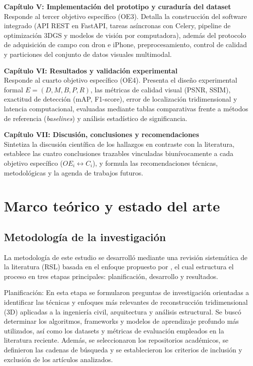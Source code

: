 \documentclass[12pt,oneside]{report}
\begin{document}
\textbf{Capítulo V: Implementación del prototipo y curaduría del dataset} \\
Responde al tercer objetivo específico (OE3). Detalla la construcción del software integrado (API REST en FastAPI, tareas asíncronas con Celery, pipeline de optimización 3DGS y modelos de visión por computadora), además del protocolo de adquisición de campo con dron e iPhone, preprocesamiento, control de calidad y particiones del conjunto de datos visuales multimodal.

\textbf{Capítulo VI: Resultados y validación experimental} \\
Responde al cuarto objetivo específico (OE4). Presenta el diseño experimental formal $E = (D, M, B, P, R)$, las métricas de calidad visual (PSNR, SSIM), exactitud de detección (mAP, F1-score), error de localización tridimensional y latencia computacional, evaluadas mediante tablas comparativas frente a métodos de referencia (\textit{baselines}) y análisis estadístico de significancia.

\textbf{Capítulo VII: Discusión, conclusiones y recomendaciones} \\
Sintetiza la discusión científica de los hallazgos en contraste con la literatura, establece las cuatro conclusiones trazables vinculadas biunívocamente a cada objetivo específico ($OE_i \leftrightarrow C_i$), y formula las recomendaciones técnicas, metodológicas y la agenda de trabajos futuros.

\chapter{Marco teórico y estado del arte}

\section{Metodología de la investigación}
La metodología de este estudio se desarrolló mediante una revisión sistemática de la literatura (RSL) basada en el enfoque propuesto por \citet{kitchenham2007}, el cual estructura el proceso en tres etapas principales: planificación, desarrollo y resultados.\par

Planificación: En esta etapa se formularon preguntas de investigación orientadas a identificar las técnicas y enfoques más relevantes de reconstrucción tridimensional (3D) aplicadas a la ingeniería civil, arquitectura y análisis estructural. Se buscó determinar los algoritmos, frameworks y modelos de aprendizaje profundo más utilizados, así como los datasets y métricas de evaluación empleados en la literatura reciente. Además, se seleccionaron los repositorios académicos, se definieron las cadenas de búsqueda y se establecieron los criterios de inclusión y exclusión de los artículos analizados.\par
\end{document}
